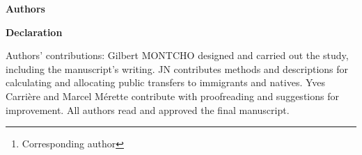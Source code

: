 \documentclass[12pt,a4paper]{article}
\begin{document}
\begin{titlepage}

  \title{\articleTwoTitle}
  \author{}
  \date{}
  \maketitle


\textbf{\LARGE Authors}
  \vspace{0.7em}\par
  \author{
    \noindent
    Gilbert MONTCHO\footnote{Corresponding author} \href{https://orcid.org/0000-0003-1845-4679}{} \\
    Department of Demography, University of Montreal\\
    gilbert.montcho@umontreal.ca

    \vspace{0.7em}\par
    \noindent
    Julien Navaux \\
    Research Chair in Intergenerational Economics, HEC Montreal \\
    julien.navaux@hec.ca

    \vspace{0.7em}\par
    \noindent
    Yves CARRIERE \\
    Department of Demography, University of Montreal \\
    yves.carriere@umontreal.ca

    \vspace{0.7em}\par
    \noindent
    Marcel MERETTE\\
    Department of Economics, University of Ottawa\\
    mmerette@uottawa.ca
  }

  \vspace{3cm}


\newpage
\textbf{\LARGE Declaration}

  \vspace{0.7em}\par
  \noindent
  Authors' contributions: Gilbert MONTCHO designed and carried out the study, including the manuscript's writing. JN contributes methods and descriptions for calculating and allocating public transfers to immigrants and natives. Yves Carrière and Marcel Mérette contribute with proofreading and suggestions for improvement. All authors read and approved the final manuscript.


\end{titlepage}
\end{document}
